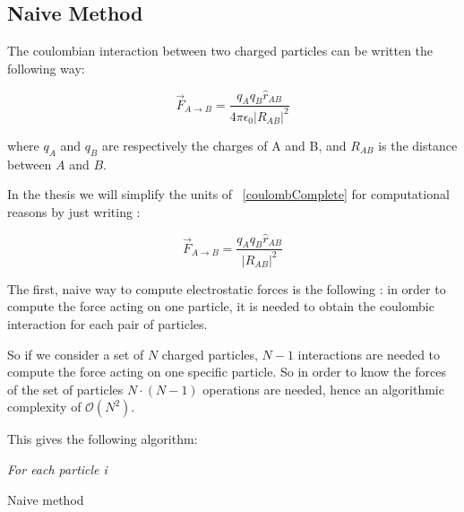 \documentclass[12pt,twoside,a4paper]{report}
\begin{document}
\subsection{Naive Method}

The coulombian interaction between two charged particles can be written the following way:

\begin{equation}
	\overrightarrow{F}_{A \rightarrow B} = \frac{q_A q_B \hat{r}_{AB} }{4\pi\epsilon_0|R_{AB}|^2}
	\label{coulombComplete}
\end{equation}

where $q_A $ and $q_B$ are respectively the charges of A and B, and $R_{AB}$ is the distance between $A$ and $B$.

In the thesis we will simplify the units of ~\eqref{coulombComplete} for computational reasons by just writing :

\begin{equation}
	\overrightarrow{F}_{A \rightarrow B} = \frac{q_A q_B \hat{r}_{AB} }{|R_{AB}|^2}
	\label{coulombSimplified}
\end{equation}

The first, naive way to compute electrostatic forces is the following : in order to compute the force acting on one particle, it is needed to obtain the coulombic interaction for each pair of particles.

So if we consider a set of $N$ charged particles, $N-1$ interactions are needed to compute the force acting on one specific particle. So in order to know the forces of the set of particles $N\cdot(N-1)$ operations are needed, hence an algorithmic complexity of $\mathcal{O}(N^2)$.

This gives the following algorithm:

\IncMargin{1em}
\begin{algorithm}[H]



\BlankLine

\emph{For each particle i}\;
\caption{Naive method}\label{algo_disjdecomp}
\end{algorithm}\DecMargin{1em}
\end{document}
